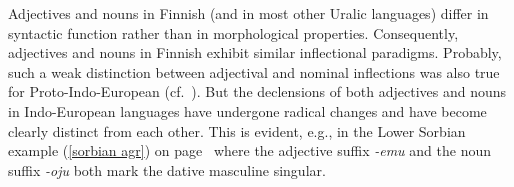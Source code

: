 Adjectives and nouns in Finnish (and in most other Uralic languages) differ in syntactic function rather than in morphological properties. Consequently, adjectives and nouns in Finnish exhibit similar inflectional paradigms. Probably, such a weak distinction between adjectival and nominal inflections was also true for Proto\hyp{}Indo-European (cf.~\citealt[80]{comrie1998}). But the declensions of both adjectives and nouns in Indo-European languages have undergone radical changes and have become clearly distinct from each other. This is evident, e.g., in the Lower Sorbian example (\ref{sorbian agr}) on page~\pageref{sorbian agr} where the adjective suffix \textit{-emu} and the noun suffix \textit{-oju} both mark the dative masculine singular.

